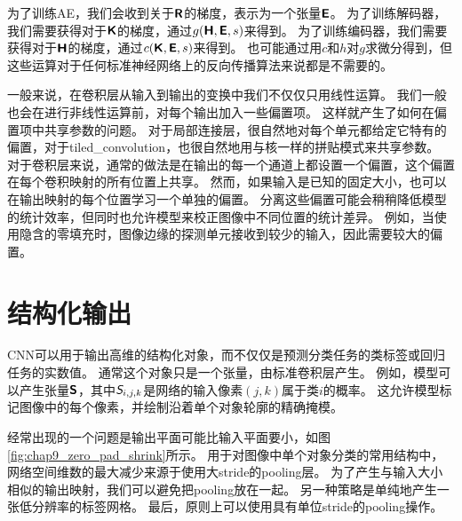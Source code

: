 为了训练\gls{AE}，我们会收到关于$\textsf{\textbf{R}}$的梯度，表示为一个张量$\textsf{\textbf{E}}$。
为了训练解码器，我们需要获得对于$\textsf{\textbf{K}}$的梯度，通过$g(\textsf{\textbf{H}}, \textsf{\textbf{E}}, s)$来得到。
为了训练编码器，我们需要获得对于$\textsf{\textbf{H}}$的梯度，通过$c(\textsf{\textbf{K}}, \textsf{\textbf{E}}, s)$来得到。
也可能通过用$c$和$h$对$g$求微分得到，但这些运算对于任何标准神经网络上的反向传播算法来说都是不需要的。
 
 
一般来说，在卷积层从输入到输出的变换中我们不仅仅只用线性运算。
我们一般也会在进行非线性运算前，对每个输出加入一些偏置项。
这样就产生了如何在偏置项中共享参数的问题。
对于局部连接层，很自然地对每个单元都给定它特有的偏置，对于\gls{tiled_convolution}，也很自然地用与核一样的拼贴模式来共享参数。
对于卷积层来说，通常的做法是在输出的每一个通道上都设置一个偏置，这个偏置在每个卷积映射的所有位置上共享。
然而，如果输入是已知的固定大小，也可以在输出映射的每个位置学习一个单独的偏置。
分离这些偏置可能会稍稍降低模型的统计效率，但同时也允许模型来校正图像中不同位置的统计差异。
例如，当使用隐含的零填充时，图像边缘的探测单元接收到较少的输入，因此需要较大的偏置。

\section{结构化输出}
\label{sec:structured_outputs}

\gls{CNN}可以用于输出高维的结构化对象，而不仅仅是预测分类任务的类标签或回归任务的实数值。
通常这个对象只是一个张量，由标准卷积层产生。
例如，模型可以产生张量$\textsf{\textbf{S}}$，其中$\textit{\textsf{S}}_{i,j,k}$是网络的输入像素$(j, k)$属于类$i$的概率。
这允许模型标记图像中的每个像素，并绘制沿着单个对象轮廓的精确掩模。

经常出现的一个问题是输出平面可能比输入平面要小，如图\ref{fig:chap9_zero_pad_shrink}所示。
用于对图像中单个对象分类的常用结构中，网络空间维数的最大减少来源于使用大\gls{stride}的\gls{pooling}层。
为了产生与输入大小相似的输出映射，我们可以避免把\gls{pooling}放在一起\citep{jain2007supervised}。
另一种策略是单纯地产生一张低分辨率的标签网格\citep{Pinheiro+Collobert-ICML2014,Pinheiro+Collobert-CVPR2015}。
最后，原则上可以使用具有单位\gls{stride}的\gls{pooling}操作。


